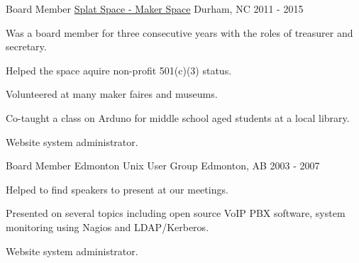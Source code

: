 

\begin{cventries}

  \cventry
    {Board Member} %
    {\href{http://splatspace.org/}{Splat Space - Maker Space}} %
    {Durham, NC} %
    {2011 - 2015} %
    {
      \begin{cvitems} %
        \item {Was a board member for three consecutive years with the roles of treasurer and secretary.}
        \item {Helped the space aquire non-profit 501(c)(3) status.}
        \item {Volunteered at many maker faires and museums.}
        \item {Co-taught a class on Arduno for middle school aged students at a local library.}
        \item {Website system administrator.}
      \end{cvitems}
    }

  \cventry
    {Board Member} %
    {Edmonton Unix User Group} %
    {Edmonton, AB} %
    {2003 - 2007} %
    {
      \begin{cvitems} %
        \item {Helped to find speakers to present at our meetings.}
        \item {Presented on several topics including open source VoIP PBX software, system monitoring using Nagios and LDAP/Kerberos.}
        \item {Website system administrator.}
      \end{cvitems}
    }

\end{cventries}
